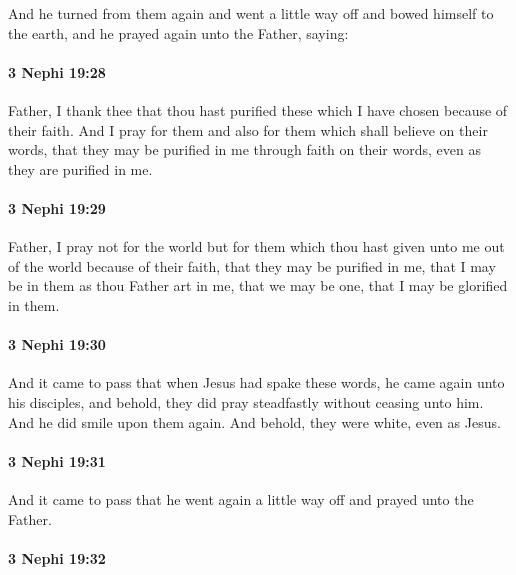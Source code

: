 			And he turned from them again and went a little way off
			and bowed himself to the earth,
			and he prayed again unto the Father, saying:

		\paragraph{3 Nephi 19:28} %
			\label{3NEPHI-19-28}

			Father, I thank thee that thou hast purified these
			which I have chosen because of their faith.
			And I pray for them and also for them which shall believe on their words,
			that they may be purified in me through faith on their words,
			even as they are purified in me.

		\paragraph{3 Nephi 19:29} %
			\label{3NEPHI-19-29}

			Father, I pray not for the world but for them
			which thou hast given unto me out of the world because of their faith,
			that they may be purified in me,
			that I may be in them as thou Father art in me,
			that we may be one,
			that I may be glorified in them.

		\paragraph{3 Nephi 19:30} %
			\label{3NEPHI-19-30}

			And it came to pass that when Jesus had spake these words,
			he came again unto his disciples,
			and behold, they did pray steadfastly without ceasing unto him.
			And he did smile upon them again.
			And behold, they were white, even as Jesus.

		\paragraph{3 Nephi 19:31} %
			\label{3NEPHI-19-31}

			And it came to pass that he went again a little way off
			and prayed unto the Father.

		\paragraph{3 Nephi 19:32} %
			\label{3NEPHI-19-32}

